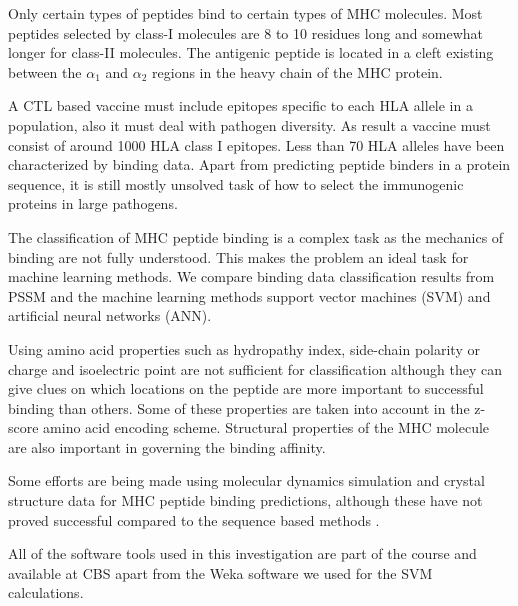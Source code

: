 Only certain types of peptides bind to certain types of MHC molecules. Most peptides selected by class-I molecules are 8 to 10 residues long
and somewhat longer for class-II molecules. The antigenic peptide is located in a cleft existing between the $\alpha_1$ and $\alpha_2$ regions in the heavy chain of the MHC protein.

A CTL based vaccine must include epitopes specific to each HLA allele in a population, also it must deal with pathogen diversity. As result a vaccine must consist of around 1000 HLA class I epitopes.
Less than 70 HLA alleles have been characterized by binding data. Apart from predicting peptide binders in a protein sequence, it is still  mostly unsolved task of how to select the immunogenic proteins in large pathogens.

The classification of MHC peptide binding is a complex task as the mechanics of binding are not fully understood. 
This makes the problem an ideal task for machine learning methods. We compare binding data classification results from PSSM and the machine learning methods support vector machines (SVM) and artificial neural networks (ANN).

Using amino acid properties such as hydropathy index, side-chain polarity or charge and isoelectric point are not sufficient for classification although they can give clues on which locations on the peptide are more important to successful binding than others. 
Some of these properties are taken into account in the z-score amino acid encoding scheme. Structural properties of the MHC molecule are also important in governing the binding affinity.

Some efforts are being made using molecular dynamics simulation and crystal structure\cite{Kumar2010} data for MHC peptide binding predictions, although these have not proved successful compared to the sequence based methods \cite{Lundegaard2008}.

All of the software tools used in this investigation are part of the course and available at CBS apart from the Weka software we used for the SVM calculations\cite{Frank2004}.
